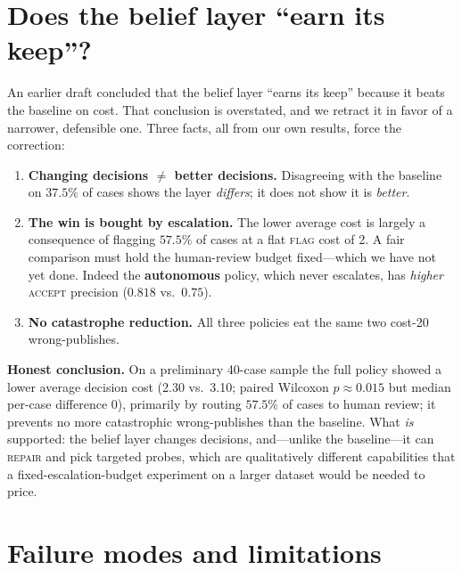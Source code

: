\documentclass[11pt]{article}
\begin{document}
\section{Does the belief layer ``earn its keep''?}
\label{sec:earnskeep}

An earlier draft concluded that the belief layer ``earns its keep'' because it beats
the baseline on cost. That conclusion is overstated, and we retract it in favor of a
narrower, defensible one. Three facts, all from our own results, force the correction:

\begin{enumerate}[nosep]
  \item \textbf{Changing decisions $\ne$ better decisions.} Disagreeing with the
        baseline on $37.5\%$ of cases shows the layer \emph{differs}; it does not show
        it is \emph{better}.
  \item \textbf{The win is bought by escalation.} The lower average cost is largely a
        consequence of flagging $57.5\%$ of cases at a flat \textsc{flag} cost of 2. A
        fair comparison must hold the human-review budget fixed---which we have not yet
        done. Indeed the \textbf{autonomous} policy, which never escalates, has
        \emph{higher} \textsc{accept} precision ($0.818$ vs.\ $0.75$).
  \item \textbf{No catastrophe reduction.} All three policies eat the same two
        cost-20 wrong-publishes.
\end{enumerate}

\noindent
\textbf{Honest conclusion.} On a preliminary 40-case sample the full policy showed a
lower average decision cost (2.30 vs.\ 3.10; paired Wilcoxon $p\approx0.015$ but median
per-case difference $0$), primarily by routing $57.5\%$ of cases to human review; it
prevents no more catastrophic wrong-publishes than the baseline. What \emph{is}
supported: the belief layer changes decisions, and---unlike the baseline---it can
\textsc{repair} and pick targeted probes, which are qualitatively different capabilities
that a fixed-escalation-budget experiment on a larger dataset would be needed to price.

\section{Failure modes and limitations}
\label{sec:limitations}
\end{document}
